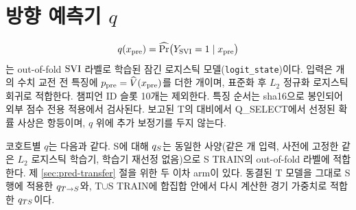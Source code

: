 \section{방향 예측기 $q$}
\label{sec:pred-q}

\begin{equation}
  q(x_{\mathrm{pre}}) = \widehat{\Pr}\bigl(Y_{\mathrm{SVI}} = 1 \mid x_{\mathrm{pre}}\bigr)
\end{equation}
는 out-of-fold $\mathrm{SVI}$ 라벨로 학습된 잠긴 로지스틱 모델(\texttt{logit\_state})이다. 입력은 \dimNumeric{}개의 수치 교전 전 특징에 $p_{\mathrm{pre}} = \widehat V(x_{\mathrm{pre}})$를 더한 \dimInputQ{}개이며, 표준화 후 $L_2$ 정규화 로지스틱 회귀로 적합한다. 챔피언 ID 슬롯 10개는 제외한다. 특징 순서는 sha16으로 봉인되어 외부 점수 전용 적용에서 검사된다. 보고된 T의 대비에서 Q\_SELECT에서 선정된 확률 사상은 항등이며, $q$ 위에 추가 보정기를 두지 않는다.

코호트별 $q$는 다음과 같다. S에 대해 $q_{S}$는 동일한 사양(같은 \dimInputQ{}개 입력, 사전에 고정한 같은 $L_2$ 로지스틱 학습기, 학습기 재선정 없음)으로 S TRAIN의 out-of-fold 라벨에 적합한다. 제 \ref{sec:pred-transfer} 절을 위한 두 이차 arm이 있다. 동결된 T 모델을 그대로 S 행에 적용한 $q_{T\to S}$와, T$\cup$S TRAIN에 합집합 안에서 다시 계산한 경기 가중치로 적합한 $q_{TS}$이다.
